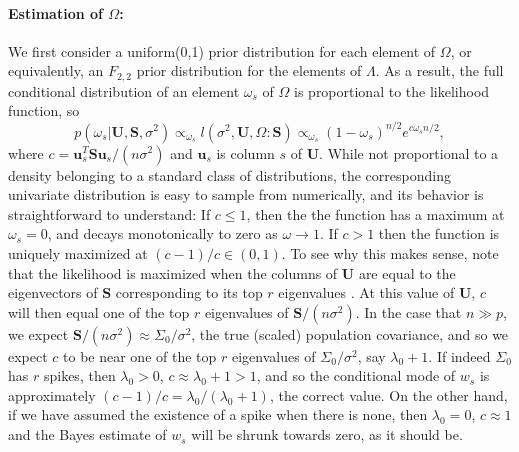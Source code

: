 \documentclass{article}
\newcommand{\bl}[1]{{\mathbf #1}}
\newcommand{\tr}{\text{tr}}
\begin{document}
\paragraph{Estimation of $\Omega$:} 
We first consider a uniform(0,1) prior distribution  for
each element of $\Omega$, or equivalently, an 
$F_{2,2}$ prior distribution for the elements of $\Lambda$. 
As a result, the full conditional distribution of 
an element  $\omega_s$ of $\Omega$ is proportional to the 
likelihood function, so 
\begin{equation} 
p(\omega_s | \bl U, \bl S, \sigma^2)   \propto_{\omega_s} 
 l(\sigma^2,\bl U, \Omega:\bl S)  \propto_{\omega_s} 
  (1-\omega_s)^{n/2} e^{c \omega_s  n/2},    
\label{eqn:wpost}
\end{equation}
where $c= \bl u_s^T \bl S \bl u_s/(n \sigma^2)$ and 
$\bl u_s$ is column $s$ of $\bl U$. 
While not proportional to a density belonging to a standard class 
of distributions, 
the corresponding 
univariate distribution is easy to sample from numerically, and 
its 
behavior is straightforward to 
understand:
If $c\leq 1$, then the the function has a maximum 
at $\omega_s =0$, and decays monotonically to zero as $\omega \rightarrow 1$. 
If $c>1$ then the function is uniquely  maximized at 
$(c-1)/c \in (0,1)$. 
To see why this makes sense, note that the likelihood is maximized when 
the columns of 
$\bl U$ are equal to the eigenvectors of $\bl S$ corresponding to its top 
$r$ eigenvalues \citep{tipping_bishop_1999}. At this value of $\bl U$, 
$c$ will then equal one of the top $r$ eigenvalues of $\bl S/(n\sigma^2)$. 
In the case  that $n\gg p$, we expect  $\bl S/(n\sigma^2)\approx \Sigma_0/\sigma^2$, 
the true (scaled) population covariance, and so we expect $c$ to be near one of the 
top $r$ eigenvalues of $\Sigma_0/\sigma^2$, say $\lambda_0+1$. 
If indeed $\Sigma_0$ has 
$r$ spikes, then  $\lambda_0>0$, $c \approx \lambda_0 +1 > 1$, and so the conditional 
mode of $w_s$ is approximately $(c-1)/c = \lambda_0/(\lambda_0+1)$, 
the correct value. 
On the other hand, if we have assumed the existence of a spike when 
there is none, then $\lambda_0=0$, $c\approx 1$ and the Bayes estimate 
of $w_s$ will be shrunk towards zero, as it should be. 
\end{document}
